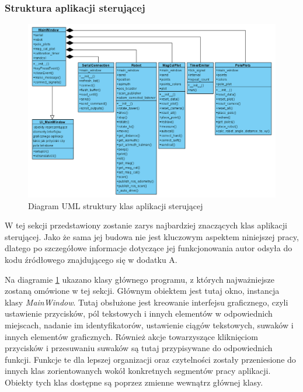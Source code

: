 \subsubsection{Struktura aplikacji sterującej}
\begin{figure}[ht]
	\centering
		\includegraphics[width=1.1\linewidth]{rys/ScanBot-PC-UML.PNG}
	\caption{Diagram UML struktury klas aplikacji sterującej}
	\label{fig:uml-class-diagram}
\end{figure}

W tej sekcji przedstawiony zostanie zarys najbardziej znaczących klas aplikacji sterującej. Jako że sama jej budowa nie jest kluczowym aspektem niniejszej pracy, dlatego po szczegółowe informacje dotyczące jej funkcjonowania autor odsyła do kodu źródłowego znajdującego się w dodatku A.

Na diagramie \ref{fig:uml-class-diagram} ukazano klasy głównego programu, z których najważniejsze zostaną omówione w tej sekcji. Głównym obiektem jest tutaj okno, instancja klasy \emph{MainWindow}. Tutaj obsłużone jest kreowanie interfejsu graficznego, czyli ustawienie przycisków, pól tekstowych i innych elementów w odpowiednich miejscach, nadanie im identyfikatorów, ustawienie ciągów tekstowych, suwaków i innych elementów graficznych. Również akcje towarzyszące kliknięciom przycisków i przesuwaniu suwaków są tutaj przypisywane do odpowiednich funkcji. Funkcje te dla lepszej organizacji oraz czytelności zostały przeniesione do innych klas zorientowanych wokół konkretnych segmentów pracy aplikacji. Obiekty tych klas dostępne są poprzez zmienne wewnątrz głównej klasy.
\\

